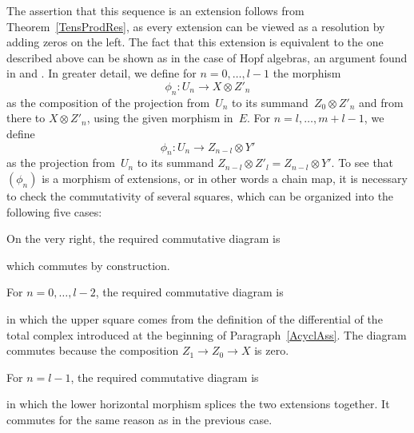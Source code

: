 \documentclass[12pt]{article}
\makeatletter
\theoremstyle{definition}
\theoremstyle{break}
\renewenvironment{proof}[1][\proofname]{\par
\vspace{-5pt}%
\pushQED{\qed}%
\normalfont
\topsep0pt \partopsep0pt %
\trivlist
\item[\hskip\labelsep
\bfseries
#1\@addpunct{.}]\ignorespaces
}{%
\popQED\endtrivlist\@endpefalse
\addvspace{6pt plus 6pt} %
}
\DeclareMathOperator\id{id}
\renewcommand{\1}{\mathbbm{1}}
\newcommand{\ot}{\mathbin{\otimes}}
\makeatother
\begin{document}
\begin{proof}
The assertion that this sequence is an extension follows from Theorem~\ref{TensProdRes}, as every extension can be viewed as a resolution by adding zeros on the left. The fact that this extension is equivalent to the one described above can be shown as in the case of Hopf algebras, an argument found in \cite[Prop.~3.2.1, p.~58]{Be} and \cite[Lem.~9.3.4, p.~191]{W2}.
In greater detail, we define for $n=0,\ldots,l-1$ the morphism
\[\phi_n \colon U_n \to X \ot Z'_{n}\]
as the composition of the projection from~$U_n$ to its summand~$Z_{0} \ot Z'_{n}$ and from there to $X \ot Z'_{n}$, using the given morphism in~$E$. For $n=l,\ldots,m+l-1$, we define
\[\phi_n \colon U_n \to Z_{n-l} \ot Y'\]
as the projection from~$U_n$ to its summand $Z_{n-l} \ot Z'_{l} = Z_{n-l} \ot Y'$. To see that~$(\phi_n)$ is a morphism of extensions, or in other words a chain map, it is necessary to check the commutativity of several squares, which can be organized into the following five cases:
\begin{parlist}
\item
On the very right, the required commutative diagram is
\begin{center}
\end{center}
which commutes by construction.

\item
For $n=0,\ldots,l-2$, the required commutative diagram is
\begin{center}
\end{center}
in which the upper square comes from the definition of the differential of the total complex introduced at the beginning of Paragraph~\ref{AcyclAss}. The diagram commutes because the composition $Z_1 \to Z_0 \to X$ is zero.

\item
For $n=l-1$, the required commutative diagram is
\begin{center}
\end{center}
in which the lower horizontal morphism splices the two extensions together. It commutes for the same reason as in the previous case.


\end{parlist}
\end{proof}
\end{document}

